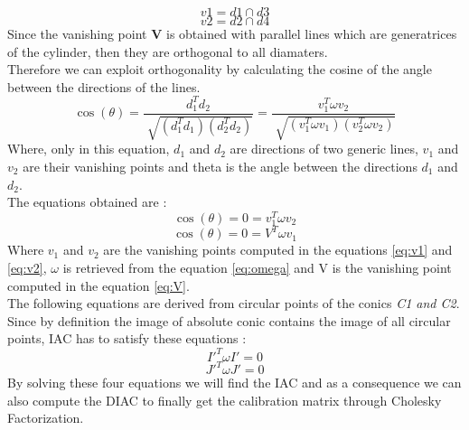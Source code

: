 \documentclass[a4paper, 11pt, oneside, openright, english]{book}
\begin{document}
\begin{equation}
    v1 = d1 \cap d3 \label{eq:v1}
\end{equation}
\begin{equation}
    v2 = d2 \cap d4 \label{eq:v2}
\end{equation}
Since the vanishing point \textbf{V} is obtained with parallel lines which are generatrices of the cylinder, then they are orthogonal to all diamaters.\\
Therefore we can exploit orthogonality by calculating the cosine of the angle between the directions of the lines.
\begin{equation}
    \cos(\theta) = \frac{d_1^{T}d_2}{\sqrt[]{(d_1^{T}d_1)(d_2^{T}d_2)}} = \frac{v_1^{T}\omega v_2}{\sqrt[]{(v_1^{T}\omega v_1)(v_2^{T}\omega v_2)}} 
\end{equation}
Where, only in this equation, $d_1$ and $d_2$ are directions of two generic lines, $v_1$ and $v_2$ are their vanishing points and theta is the angle between the directions $d_1$ and $d_2$.\\
The equations obtained are :
\begin{equation}
    \cos(\theta) = 0 = v_1^{T}\omega v_2
\end{equation}
\begin{equation}
    \cos(\theta) = 0 = V^{T}\omega v_1
\end{equation}
Where $v_1$ and $v_2$ are the vanishing points computed in the equations \ref{eq:v1} and \ref{eq:v2}, $\omega$ is retrieved from the equation \ref{eq:omega} and V is the vanishing point computed in the equation \ref{eq:V}.
\\The following equations are derived from circular points of the conics \textit{C1 and C2}. \\
Since by definition the image of absolute conic contains the image of all circular points, IAC has to satisfy these equations :
\begin{equation}
    I'^{T}\omega I' = 0
\end{equation}
\begin{equation}
    J'^{T}\omega J' = 0
\end{equation}
By solving these four equations we will find the IAC and as a consequence we can also compute the DIAC to finally get the calibration matrix through Cholesky Factorization.
\end{document}
